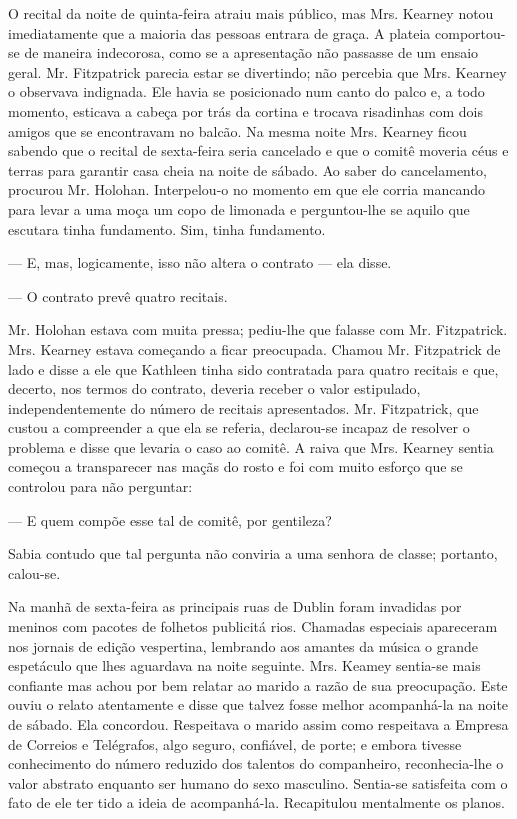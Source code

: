O recital da noite de quinta-feira atraiu mais público, mas Mrs.
Kearney notou imediatamente que a maioria das pessoas entrara de
graça. A plateia comportou-se de maneira indecorosa, como se a
apresentação não passasse de um ensaio geral. Mr. Fitzpatrick parecia
estar se divertindo; não percebia que Mrs. Kearney o observava
indignada. Ele havia se posicionado num canto do palco e, a todo
momento, esticava a cabeça por trás da cortina e trocava risadinhas
com dois amigos que se encontravam no balcão. Na mesma noite Mrs.
Kearney ficou sabendo que o recital de sexta-feira seria cancelado e
que o comitê moveria céus e terras para garantir casa cheia na noite
de sábado. Ao saber do cancelamento, procurou Mr. Holohan.
Interpelou-o no momento em que ele corria mancando para levar a uma
moça um copo de limonada e perguntou-lhe se aquilo que escutara tinha
fundamento. Sim, tinha fundamento.

--- E, mas, logicamente, isso não altera o contrato --- ela disse.

--- O contrato prevê quatro recitais.

Mr. Holohan estava com muita pressa; pediu-lhe que falasse com Mr.
Fitzpatrick. Mrs. Kearney estava começando a ficar preocupada. Chamou
Mr. Fitzpatrick de lado e disse a ele que Kathleen tinha sido
contratada para quatro recitais e que, decerto, nos termos do
contrato, deveria receber o valor estipulado, independentemente do
número de recitais apresentados. Mr. Fitzpatrick, que custou a
compreender a que ela se referia, declarou-se incapaz de resolver o
problema e disse que levaria o caso ao comitê. A raiva que Mrs.
Kearney sentia começou a transparecer
nas maçãs do rosto e foi com muito esforço que se controlou para não
perguntar:

--- E quem compõe esse tal de comitê, por gentileza?

Sabia contudo que tal pergunta não conviria a uma senhora de classe;
portanto, calou-se.

Na manhã de sexta-feira as principais ruas de Dublin foram invadidas
por meninos com pacotes de folhetos publicitá rios. Chamadas
especiais apareceram nos jornais de edição vespertina, lembrando aos
amantes da música o grande espetáculo que lhes aguardava na noite
seguinte. Mrs. Keamey sentia-se mais confiante mas achou por bem
relatar ao marido a razão de sua preocupação. Este ouviu o relato
atentamente e disse que talvez fosse melhor acompanhá-la na noite de
sábado. Ela concordou. Respeitava o marido assim como respeitava a
Empresa de Correios e Telégrafos, algo seguro, confiável, de porte; e
embora tivesse conhecimento do número reduzido dos talentos do
companheiro, reconhecia-lhe o valor abstrato enquanto ser humano do
sexo masculino. Sentia-se satisfeita com o fato de ele ter tido a
ideia de acompanhá-la. Recapitulou mentalmente os planos.

